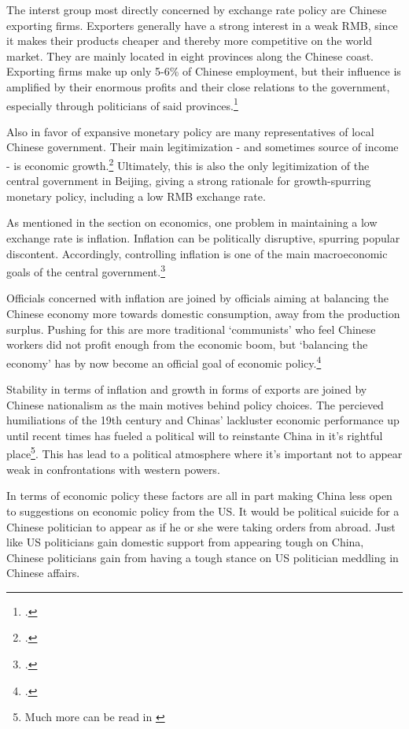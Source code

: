 The interst group most directly concerned by exchange rate policy are 
Chinese exporting firms. Exporters generally have a strong interest in a 
weak RMB, since it makes their products cheaper and thereby more 
competitive on the world market. They are mainly located in eight 
provinces along the Chinese coast. Exporting firms make up only 5-6\% of 
Chinese employment, but their influence is amplified by their enormous 
profits and their close relations to the government, especially through 
politicians of said provinces.\footnote{\cite[p. 202]{Breslin2010}.} 

Also in favor of expansive monetary policy are many representatives of 
local Chinese government. Their main legitimization - and sometimes 
source of income - is economic growth.\footnote{\cite[pp. 
19]{Levy2011}.} Ultimately, this is also the only legitimization of the 
central government in Beijing, giving a strong rationale for 
growth-spurring monetary policy, including a low RMB exchange rate.

As mentioned in the section on economics, one problem in maintaining a 
low exchange rate is inflation. Inflation can be politically disruptive, 
spurring popular discontent. Accordingly, controlling inflation is one 
of the main macroeconomic goals of the central 
government.\footnote{\cite{Naugthon2011}.}

Officials concerned with inflation are joined by officials aiming at balancing the Chinese economy more towards domestic consumption, away from the production surplus. Pushing for this are more traditional `communists' who feel Chinese workers did not profit enough from the economic boom, but `balancing the economy' has by now become an official goal of economic policy.\footnote{\cite{Xinhua2011}.}

Stability in terms of inflation and growth in forms of exports are
joined by Chinese nationalism as the main motives behind policy choices.  
The percieved humiliations of the 19th century and Chinas' lackluster
economic performance up until recent times has fueled a political will
to reinstante China in it's rightful place\footnote{Much more can be
read in \cite{hughes2006}}. This has lead to a political atmosphere
where it's important not to appear weak in confrontations with western
powers.

In terms of economic policy these factors are all in part making China
less open to suggestions on economic policy from the US. It would be
political suicide for a Chinese politician to appear as if he or she
were taking orders from abroad.  Just like US politicians gain domestic
support from appearing tough on China, Chinese politicians gain from
having a tough stance on US politician meddling in Chinese affairs.

